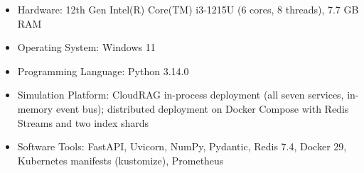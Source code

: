 \begin{itemize}
    \item Hardware: 12th Gen Intel(R) Core(TM) i3-1215U (6 cores, 8 threads), 7.7 GB RAM
    \item Operating System: Windows 11
    \item Programming Language: Python 3.14.0
    \item Simulation Platform: CloudRAG in-process deployment (all seven services, in-memory event bus); distributed deployment on Docker Compose with Redis Streams and two index shards
    \item Software Tools: FastAPI, Uvicorn, NumPy, Pydantic, Redis 7.4, Docker 29, Kubernetes manifests (kustomize), Prometheus
\end{itemize}
